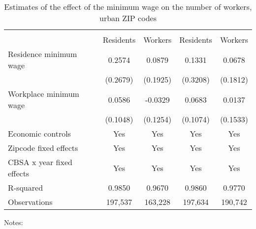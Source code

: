 \begin{table}[hbt!] \centering
    \caption{Estimates of the effect of the minimum wage on the number of workers, urban ZIP codes}
    \label{tab:total_migration}
    \begin{tabular}{lcccc}
        \toprule 
        &  &  \\ \cmidrule(lr){2-3} \cmidrule(lr){4-5}
                    & Residents & Workers & Residents & Workers \\  \midrule
        Residence minimum wage &  0.2574  &  0.0879  &  0.1331  &  0.0678  \\
                               & (0.2679) & (0.1925) & (0.3208) & (0.1812) \\
        Workplace minimum wage &  0.0586  &  -0.0329  &  0.0683  &  0.0137  \\
                               & (0.1048) & (0.1254) & (0.1074) & (0.1533) \\  \midrule
        Economic controls           &  Yes   &  Yes   &  Yes  &  Yes  \\
        Zipcode fixed effects       &  Yes   &  Yes   &  Yes  &  Yes  \\
        CBSA x year fixed effects   &  Yes   &  Yes   &  Yes  &  Yes  \\
        R-squared                   &  0.9850   &  0.9670   &  0.9860  &  0.9770  \\
        Observations                &  197,537  &  163,228  &  197,634 &  190,742  
        \\\bottomrule
    \end{tabular}
    
    \begin{minipage}{.95\textwidth} \footnotesize
        \vspace{2mm}
        Notes:
    \end{minipage}
\end{table}
